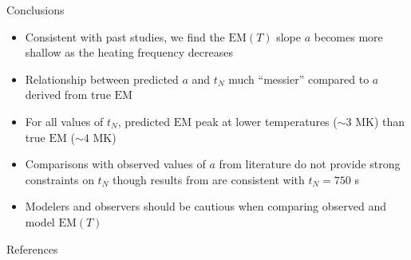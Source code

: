 \documentclass[final]{beamer}
\begin{document}
\begin{frame}
\begin{columns}[T]
\begin{column}{0.49\linewidth}
\begin{block}{Conclusions}
\begin{itemize}
        \item Consistent with past studies, we find the $\mathrm{EM}(T)$ slope $a$ becomes more shallow as the heating frequency decreases
        \item Relationship between predicted $a$ and $t_N$ \alert{much ``messier'' compared to $a$ derived from true $\mathrm{EM}$}
        \item For all values of $t_N$, predicted $\mathrm{EM}$ peak at lower temperatures ($\sim3$ MK) than true $\mathrm{EM}$ ($\sim4$ MK)
        \item Comparisons with observed values of $a$ from literature \alert{do not provide strong constraints on $t_N$} though results from \citet{del_zanna_evolution_2015} are consistent with $t_N=750$ s
        \item Modelers and observers should \alert{be cautious when comparing observed and model $\mathrm{EM}(T)$}
      \end{itemize}
    \end{block}
    \begin{block}{References}
      \scriptsize
      \begin{multicols}{2}
        
        
      \end{multicols}
    \end{block}
  \end{column}
  \end{columns}
\end{frame}
\end{document}
